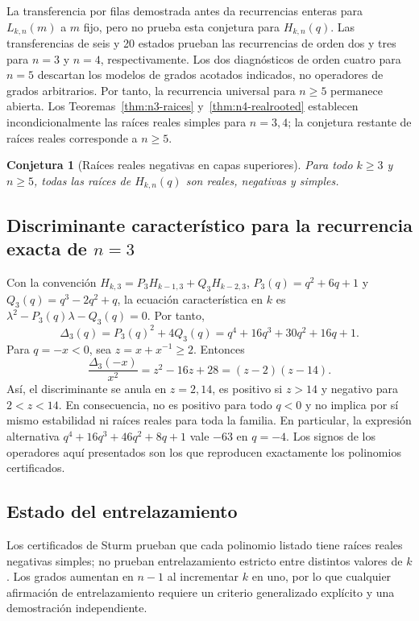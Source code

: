 \documentclass[11pt,a4paper]{article}
\newtheorem{conjecture}[theorem]{Conjetura}
\theoremstyle{definition}
\begin{document}
La transferencia por filas demostrada antes da recurrencias enteras para
$L_{k,n}(m)$ a $m$ fijo, pero no prueba esta conjetura para $H_{k,n}(q)$.
Las transferencias de seis y 20 estados prueban las recurrencias de orden
dos y tres para $n=3$ y $n=4$, respectivamente. Los dos diagnósticos de
orden cuatro para $n=5$ descartan los modelos de grados acotados
indicados, no operadores de grados arbitrarios. Por tanto, la recurrencia
universal para $n\ge5$ permanece abierta. Los
Teoremas~\ref{thm:n3-raices} y~\ref{thm:n4-realrooted} establecen
incondicionalmente las raíces reales simples para $n=3,4$; la conjetura
restante de raíces reales corresponde a $n\ge5$.

\begin{conjecture}[Raíces reales negativas en capas superiores]
\label{conj:raices}
Para todo $k\ge3$ y $n\ge5$, todas las raíces de $H_{k,n}(q)$ son reales, negativas y simples.
\end{conjecture}

\subsection[Discriminante característico para la recurrencia exacta de n=3]{Discriminante característico para la recurrencia exacta de $n=3$}

Con la convención $H_{k,3}=P_3H_{k-1,3}+Q_3H_{k-2,3}$,
$P_3(q)=q^2+6q+1$ y $Q_3(q)=q^3-2q^2+q$, la ecuación característica en $k$ es $\lambda^2-P_3(q)\lambda-Q_3(q)=0$. Por tanto,
\[
\Delta_3(q)=P_3(q)^2+4Q_3(q)
=q^4+16q^3+30q^2+16q+1.
\]
Para $q=-x<0$, sea $z=x+x^{-1}\ge2$. Entonces
\[
\frac{\Delta_3(-x)}{x^2}=z^2-16z+28=(z-2)(z-14).
\]
Así, el discriminante se anula en $z=2,14$, es positivo si $z>14$ y negativo para $2<z<14$. En consecuencia, no es positivo para todo $q<0$ y no implica por sí mismo estabilidad ni raíces reales para toda la familia. En particular, la expresión alternativa $q^4+16q^3+46q^2+8q+1$ vale $-63$ en $q=-4$. Los signos de los operadores aquí presentados son los que reproducen exactamente los polinomios certificados.

\subsection{Estado del entrelazamiento}

Los certificados de Sturm prueban que cada polinomio listado tiene raíces reales negativas simples; no prueban entrelazamiento estricto entre distintos valores de $k$. Los grados aumentan en $n-1$ al incrementar $k$ en uno, por lo que cualquier afirmación de entrelazamiento requiere un criterio generalizado explícito y una demostración independiente.
\end{document}
